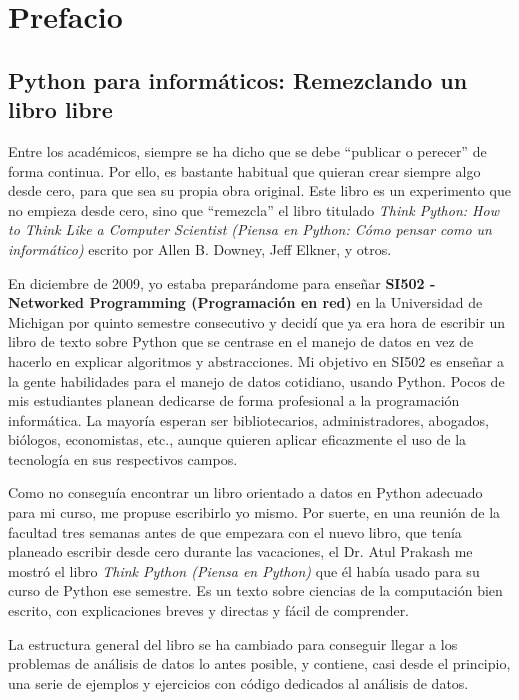 
\chapter{Prefacio}

\section*{Python para informáticos: Remezclando un libro libre}

Entre los académicos, siempre se ha dicho que se debe ``publicar o perecer''
de forma continua. Por ello, es bastante habitual que quieran crear siempre algo desde cero,
para que sea su propia obra original. Este libro es un
experimento que no empieza desde cero, sino que ``remezcla''
el libro titulado
\emph{Think Python: How to Think Like
a Computer Scientist (Piensa en Python: Cómo pensar como
un informático)}
escrito por Allen B. Downey, Jeff Elkner, y otros.

En diciembre de 2009, yo estaba preparándome para enseñar
{\bf SI502 - Networked Programming (Programación en red)}
en la Universidad de Michigan
por quinto semestre consecutivo y decidí que ya era hora
de escribir un libro de texto sobre Python que se centrase en el manejo de datos
en vez de hacerlo en explicar algoritmos y abstracciones.
Mi objetivo en SI502 es enseñar a la gente habilidades para
el manejo de datos cotidiano, usando Python.
Pocos de mis estudiantes planean dedicarse de forma profesional
a la programación informática. La mayoría esperan ser
bibliotecarios, administradores, abogados, biólogos, economistas, etc.,
aunque quieren aplicar eficazmente el uso de la tecnología en sus respectivos campos.

Como no conseguía encontrar un libro orientado a datos en Python
adecuado para mi curso, me propuse escribirlo yo mismo.
Por suerte, en una reunión de la facultad tres semanas
antes de que empezara con el nuevo libro, que tenía planeado
escribir desde cero durante las vacaciones,
el Dr. Atul Prakash me mostró el libro \emph{Think Python (Piensa en Python)}
que él había usado para su curso de Python ese semestre.
Es un texto sobre ciencias de la computación bien escrito,
con explicaciones breves y directas y fácil de comprender.

La estructura general del libro
se ha cambiado para conseguir llegar a los problemas de análisis de datos
lo antes posible, y contiene, casi desde el principio, una serie de ejemplos
y ejercicios con código dedicados al análisis de datos.

